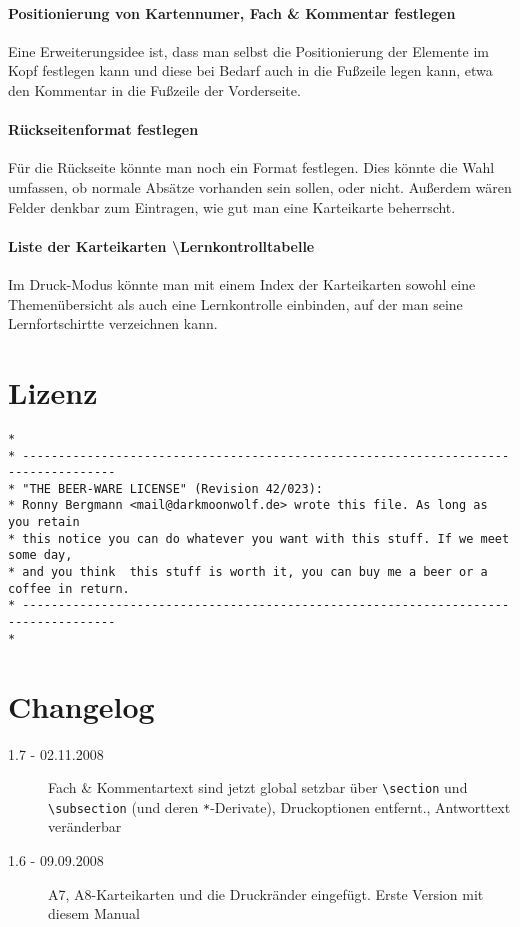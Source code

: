 \documentclass[a4paper]{article}
\begin{document}
\paragraph{Positionierung von Kartennumer, Fach \& Kommentar festlegen}
Eine Erweiterungsidee ist, dass man selbst die Positionierung der Elemente im Kopf festlegen kann und diese bei Bedarf auch in die Fußzeile legen kann, etwa den Kommentar in die Fußzeile der Vorderseite.

\paragraph{Rückseitenformat festlegen} 
Für die Rückseite könnte man noch ein Format festlegen. Dies könnte die Wahl umfassen, ob normale Absätze vorhanden sein sollen, oder nicht. Außerdem wären Felder denkbar zum Eintragen, wie gut man eine Karteikarte beherrscht.

\paragraph{Liste der Karteikarten \textbackslash Lernkontrolltabelle} 
Im Druck-Modus könnte man mit einem Index der Karteikarten sowohl eine Themenübersicht als auch eine Lernkontrolle einbinden, auf der man seine Lernfortschirtte verzeichnen kann.
\newpage
\section{Lizenz}
\begin{lstlisting}[basicstyle=\footnotesize\sffamily, numbers=none]
*
* -----------------------------------------------------------------------------------
* "THE BEER-WARE LICENSE" (Revision 42/023):
* Ronny Bergmann <mail@darkmoonwolf.de> wrote this file. As long as you retain 
* this notice you can do whatever you want with this stuff. If we meet some day,
* and you think  this stuff is worth it, you can buy me a beer or a coffee in return. 
* -----------------------------------------------------------------------------------
*
\end{lstlisting}

\section{Changelog}
\begin{description}
	\item[1.7 - 02.11.2008] Fach \& Kommentartext sind jetzt global setzbar über \lstinline!\section! und \lstinline!\subsection! (und deren \lstinline!*!-Derivate), Druckoptionen entfernt., Antworttext veränderbar
	\item[1.6 - 09.09.2008] A7, A8-Karteikarten und die Druckränder eingefügt. Erste Version mit diesem Manual
\end{description}
\end{document}
